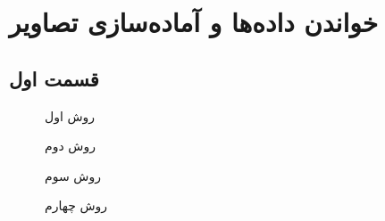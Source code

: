 \chapter{خواندن داده‌ها و آماده‌سازی تصاویر}

\ptext[1]

\section{قسمت اول}

\ptext[2]
\cite{fieldtrip-prepare_mesh_segmentation.m}

\begin{figure}[t!]
	\centering
	\removevspace
	\caption{روش اول}
	\label{fig:method1-isosurface}
\end{figure}



\begin{figure}[t!]
	\centering
	\removevspace
	\caption{روش دوم}
	\label{fig:method2-isosurface}
\end{figure}



\begin{figure}[t!]
	\centering
	\removevspace
	\caption{روش سوم}
	\label{fig:method3-bwperim3}
\end{figure}


\begin{figure}[t!]
	\centering
	\removevspace
	\caption{روش چهارم}
	\label{fig:method4-iso2mesh}
\end{figure}














